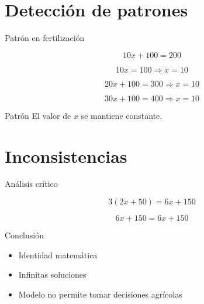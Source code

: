 \documentclass[10pt]{beamer}
\newcommand{\pp}{\pause}
\begin{document}
	\section{Detección de patrones}
	
	\begin{frame}{Patrón en fertilización}
		
		\[
		10x + 100 = 200
		\]
		
		\pp
		
		\[
		10x = 100 \Rightarrow x = 10
		\]
		
		\pp
		
		\[
		20x + 100 = 300 \Rightarrow x = 10
		\]
		
		\pp
		
			\[
		30x + 100 = 400 \Rightarrow x = 10
		\]
		
		\pp
		
		\begin{block}{Patrón}
			El valor de $x$ se mantiene constante.
		\end{block}
		
	\end{frame}
	
	\section{Inconsistencias}
	
	\begin{frame}{Análisis crítico}
		
		\[
		3(2x + 50) = 6x + 150
		\]
		
		\pp
		
		\[
		6x + 150 = 6x + 150
		\]
		
		\pp
		
		\begin{block}{Conclusión}
			\begin{itemize}
				\item Identidad matemática
				\item Infinitas soluciones
				\item Modelo no permite tomar decisiones agrícolas
			\end{itemize}
		\end{block}
		
	\end{frame}
	
\end{document}
